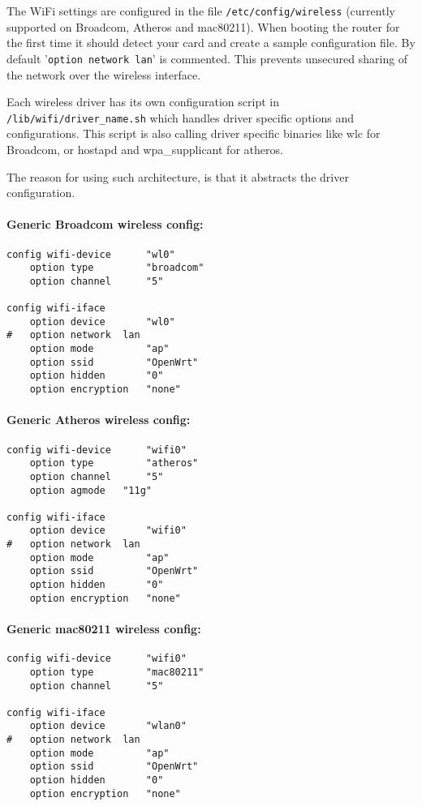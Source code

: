 The WiFi settings are configured in the file \texttt{/etc/config/wireless}
(currently supported on Broadcom, Atheros and mac80211). When booting the router for the first time
it should detect your card and create a sample configuration file. By default '\texttt{option network  lan}' is
commented. This prevents unsecured sharing of the network over the wireless interface.

Each wireless driver has its own configuration script in \texttt{/lib/wifi/driver\_name.sh} which handles
driver specific options and configurations. This script is also calling driver specific binaries like wlc for
Broadcom, or hostapd and wpa\_supplicant for atheros.

The reason for using such architecture, is that it abstracts the driver configuration. 

\paragraph{Generic Broadcom wireless config:}

\begin{Verbatim}
config wifi-device      "wl0"
    option type         "broadcom"
    option channel      "5"

config wifi-iface
    option device       "wl0"
#   option network  lan
    option mode         "ap"
    option ssid         "OpenWrt"
    option hidden       "0"
    option encryption   "none"
\end{Verbatim}

\paragraph{Generic Atheros wireless config:}

\begin{Verbatim}
config wifi-device      "wifi0"
    option type         "atheros"
    option channel      "5"
    option agmode  	"11g"

config wifi-iface
    option device       "wifi0"
#   option network  lan
    option mode         "ap"
    option ssid         "OpenWrt"
    option hidden       "0"
    option encryption   "none"
\end{Verbatim}

\paragraph{Generic mac80211 wireless config:}

\begin{Verbatim}
config wifi-device      "wifi0"
    option type         "mac80211"
    option channel      "5"

config wifi-iface
    option device       "wlan0"
#   option network  lan
    option mode         "ap"
    option ssid         "OpenWrt"
    option hidden       "0"
    option encryption   "none"
\end{Verbatim}

